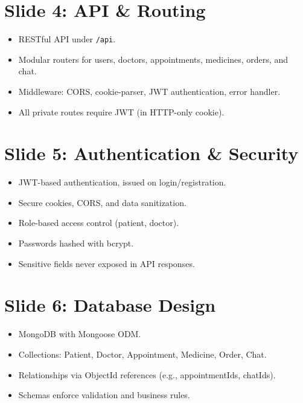 \documentclass[12pt]{article}
\begin{document}

\section*{Slide 4: API \& Routing}
\begin{itemize}[leftmargin=1cm]
    \item RESTful API under \texttt{/api}.
    \item Modular routers for users, doctors, appointments, medicines, orders, and chat.
    \item Middleware: CORS, cookie-parser, JWT authentication, error handler.
    \item All private routes require JWT (in HTTP-only cookie).
\end{itemize}


\section*{Slide 5: Authentication \& Security}
\begin{itemize}[leftmargin=1cm]
    \item JWT-based authentication, issued on login/registration.
    \item Secure cookies, CORS, and data sanitization.
    \item Role-based access control (patient, doctor).
    \item Passwords hashed with bcrypt.
    \item Sensitive fields never exposed in API responses.
\end{itemize}


\section*{Slide 6: Database Design}
\begin{itemize}[leftmargin=1cm]
    \item MongoDB with Mongoose ODM.
    \item Collections: Patient, Doctor, Appointment, Medicine, Order, Chat.
    \item Relationships via ObjectId references (e.g., appointmentIds, chatIds).
    \item Schemas enforce validation and business rules.
\end{itemize}
\end{document}
